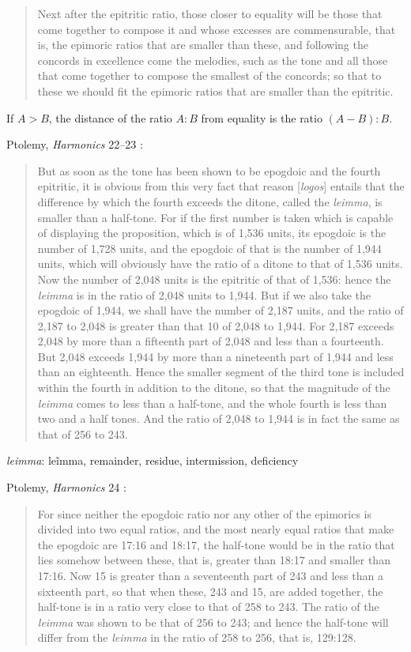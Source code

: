 \documentclass{amsart}
\newcommand{\textgreek}[1]{\begingroup\fontencoding{LGR}\selectfont#1\endgroup}
\theoremstyle{definition}
\begin{document}
\begin{quote}
Next after the epitritic ratio, those closer to equality will be those that come
together to compose it and whose excesses are commensurable, that is, the
epimoric ratios that are smaller than these, and following the concords in
excellence come the melodies, such as the tone and all those that come together
to compose the smallest of the concords; so that to these we should fit the
epimoric ratios that are smaller than the epitritic.
\end{quote}

If $A>B$,
the distance of the ratio $A:B$ from equality is the ratio $(A-B):B$.

Ptolemy, {\em Harmonics} 22--23 \cite[pp.~296--297]{barker}:

\begin{quote}
But as soon as the tone has been shown to be epogdoic and the fourth
epitritic, it is obvious from this very fact that reason [{\em logos}] entails that the
difference by which the fourth exceeds the ditone, called the {\em leimma}, is smaller
than a half-tone. For if the first number is taken which is capable of displaying
the proposition, which is of 1,536 units, its epogdoic is the number of 1,728
units, and the epogdoic of that is the number of 1,944 units, which will
obviously have the ratio of a ditone to that of 1,536 units. Now the number of
2,048 units is the epitritic of that of 1,536: hence the {\em leimma} is in the ratio of
2,048 units to 1,944. But if we also take the epogdoic of 1,944, we shall have
the number of 2,187 units, and the ratio of 2,187 to 2,048 is greater than that
10 of 2,048 to 1,944. For 2,187 exceeds 2,048 by more than a fifteenth part of 2,048
and less than a fourteenth. But 2,048 exceeds 1,944 by more than a nineteenth
part of 1,944 and less than an eighteenth. Hence the smaller segment of the
third tone is included within the fourth in addition to the ditone, so that the
magnitude of the {\em leimma} comes to less than a half-tone, and the whole fourth
is less than two and a half tones. And the ratio of 2,048 to 1,944 is in fact
the same as that of 256 to 243.
\end{quote}

{\em leimma}: \textgreek{le\~imma}, remainder, residue, intermission, deficiency

Ptolemy, {\em Harmonics} 24 \cite[pp.~297--298]{barker}:

\begin{quote}
For since
neither the epogdoic ratio nor any other of the epimorics is divided into two
equal ratios, and the most nearly equal ratios that make the epogdoic are
17:16 and 18:17, the half-tone would be in the ratio that lies somehow between
these, that is, greater than 18:17 and smaller than 17:16. Now 15 is greater
than a seventeenth part of 243 and less than a sixteenth part, so that when
these, 243 and 15, are added together, the half-tone is in a ratio very close to
that of 258 to 243. The ratio of the {\em leimma} was shown to be that of 256 to 243;
and hence the half-tone will differ from the {\em leimma} in the ratio of 258 to 256,
that is, 129:128.
\end{quote}
\end{document}
